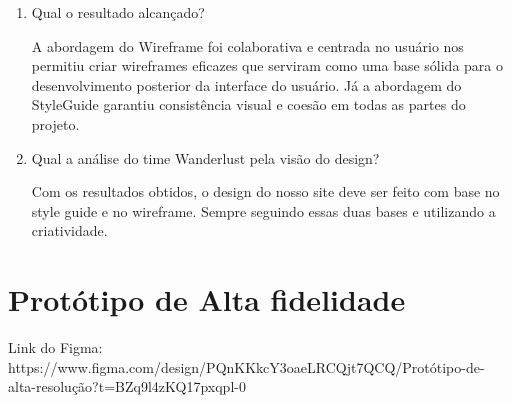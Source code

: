 \documentclass{article}
\begin{document}
\begin{enumerate}
      \item Qual o resultado alcançado?

            A abordagem do Wireframe foi colaborativa e centrada no usuário nos permitiu criar wireframes eficazes que serviram como uma base sólida para o desenvolvimento posterior da interface do usuário. Já a abordagem do StyleGuide garantiu consistência visual e coesão em todas as partes do projeto.

      \item Qual a análise do time Wanderlust pela visão do design?

            Com os resultados obtidos, o design do nosso site deve ser feito com base no style guide e no wireframe. Sempre seguindo essas duas bases e utilizando a criatividade.

\end{enumerate}

\section{Protótipo de Alta fidelidade}
Link do Figma: https://www.figma.com/design/PQnKKkcY3oaeLRCQjt7QCQ/Protótipo-de-alta-resolução?t=BZq9l4zKQ17pxqpl-0
\end{document}
